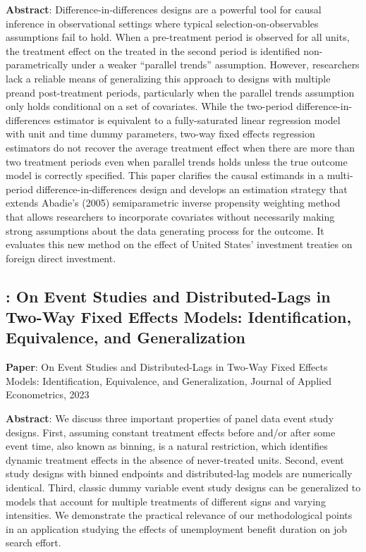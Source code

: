 \documentclass[12pt]{article}
\theoremstyle{definition}
\begin{document}
{\bf Abstract}: Difference-in-differences designs are a powerful tool for causal inference in observational settings where typical selection-on-observables assumptions fail to hold. When a pre-treatment period is observed for all units, the treatment effect on the treated in the second period is identified non-parametrically under a weaker “parallel trends” assumption. However, researchers lack a reliable means of generalizing this approach to designs with multiple preand post-treatment periods, particularly when the parallel trends assumption only holds conditional on a set of covariates. While the two-period difference-in-differences estimator is equivalent to a fully-saturated linear regression model with unit and time dummy parameters, two-way fixed effects regression estimators do not recover the average treatment effect when there are more than two treatment periods even when parallel trends holds unless the true outcome model is correctly specified. This paper clarifies the causal estimands in a multi-period difference-in-differences design and develops an estimation strategy that extends Abadie's (2005) semiparametric inverse propensity weighting method that allows researchers to incorporate covariates without necessarily making strong assumptions about the data generating process for the outcome. It evaluates this new method on the effect of United States' investment treaties on foreign direct investment.


\subsection{\citet{schmidheinyEventStudiesDistributed2023}: On Event Studies and Distributed-Lags in Two-Way Fixed Effects Models: Identification, Equivalence, and Generalization}

{\bf Paper}: On Event Studies and Distributed-Lags in Two-Way Fixed Effects Models: Identification, Equivalence, and Generalization, Journal of Applied Econometrics, 2023

{\bf Abstract}: We discuss three important properties of panel data event study designs. First,  assuming constant treatment effects before and/or after some event time, also  known as binning, is a natural restriction, which identifies dynamic treatment  effects in the absence of never-treated units. Second, event study designs with  binned endpoints and distributed-lag models are numerically identical. Third,  classic dummy variable event study designs can be generalized to models that  account for multiple treatments of different signs and varying intensities. We  demonstrate the practical relevance of our methodological points in an application studying the effects of unemployment benefit duration on job search  effort.
\end{document}
